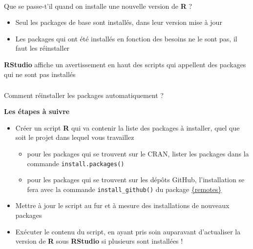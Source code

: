 \documentclass[
  french,
  10pt,
  a4paper,
]{article}
\makeatletter
\let\oldparagraph\paragraph
\renewcommand{\paragraph}{
    \@ifstar
      \xxxParagraphStar
      \xxxParagraphNoStar
  }
\newcommand{\xxxParagraphStar}[1]{\oldparagraph*{#1}\mbox{}}
\newcommand{\xxxParagraphNoStar}[1]{\oldparagraph{#1}\mbox{}}
\let\oldsubparagraph\subparagraph
\renewcommand{\subparagraph}{
    \@ifstar
      \xxxSubParagraphStar
      \xxxSubParagraphNoStar
  }
\newcommand{\xxxSubParagraphStar}[1]{\oldsubparagraph*{#1}\mbox{}}
\newcommand{\xxxSubParagraphNoStar}[1]{\oldsubparagraph{#1}\mbox{}}
\providecommand{\tightlist}{%
  \setlength{\itemsep}{0pt}\setlength{\parskip}{0pt}}
\makeatother
\begin{document}
\paragraph{\texorpdfstring{Que se passe-t'il quand on installe une
nouvelle version de \textbf{R}
?}{Que se passe-t'il quand on installe une nouvelle version de R ?}}\label{que-se-passe-til-quand-on-installe-une-nouvelle-version-de-r}

\begin{itemize}
\tightlist
\item
  Seul les packages de base sont installés, dans leur version mise à
  jour
\item
  Les packages qui ont été installés en fonction des besoins ne le sont
  pas, il faut les réinstaller
\end{itemize}

\begin{tcolorbox}[enhanced jigsaw, arc=.35mm, bottomrule=.15mm, breakable, colback=white, colframe=quarto-callout-note-color-frame, left=2mm, leftrule=.75mm, opacityback=0, rightrule=.15mm, toprule=.15mm]
\begin{minipage}[t]{5.5mm}
\textcolor{quarto-callout-note-color}{\faInfo}
\end{minipage}%
\begin{minipage}[t]{\textwidth - 5.5mm}

\textbf{RStudio} affiche un avertissement en haut des scripts qui
appellent des packages qui ne sont pas installés

\end{minipage}%
\end{tcolorbox}

\subparagraph{Comment réinstaller les packages automatiquement
?}\label{comment-ruxe9installer-les-packages-automatiquement}

\textbf{Les étapes à suivre}

\begin{itemize}
\item
  Créer un script \textbf{R} qui va contenir la liste des packages à
  installer, quel que soit le projet dans lequel vous travaillez

  \begin{itemize}
  \tightlist
  \item
    pour les packages qui se trouvent sur le CRAN, lister les packages
    dans la commande \texttt{install.packages()}\\
  \item
    pour les packages qui se trouvent sur les dépôts GitHub,
    l'installation se fera avec la commande \texttt{install\_github()}
    du package \href{https://remotes.r-lib.org/}{{\{remotes\}}}
  \end{itemize}
\item
  Mettre à jour le script au fur et à mesure des installations de
  nouveaux packages
\item
  Exécuter le contenu du script, en ayant pris soin auparavant
  d'actualiser la version de \textbf{R} sous \textbf{RStudio} si
  plusieurs sont installées !
\end{itemize}
\end{document}
